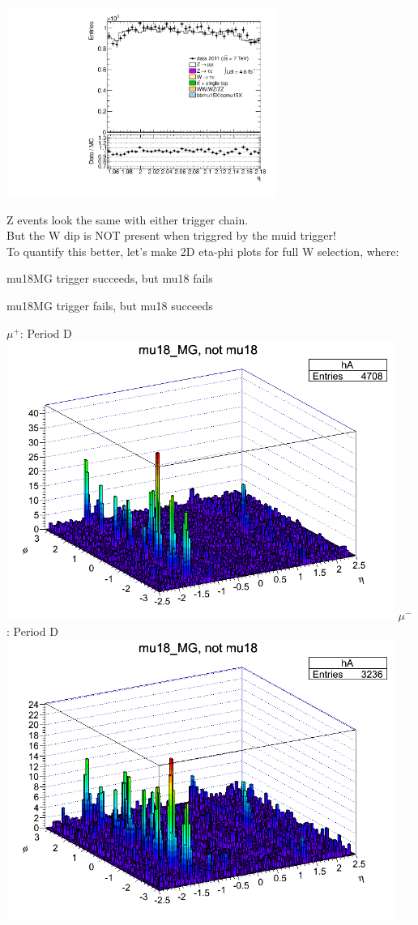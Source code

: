 {\includegraphics[width=0.66\textwidth]{dates/20130306/figures/mu18/ZMU18_10_A_stack_lN_eta_ALL.pdf} 
\cole
}

 {
 Z events look the same with either trigger chain. \\
 But the W dip is NOT present when triggred by the muid trigger! \\
 To quantify this better, let's make 2D eta-phi plots for full W selection, where:
 \iteb
 \item mu18MG trigger succeeds, but mu18 fails
 \item mu18MG trigger fails, but mu18 succeeds
 \itee
}
 {
\colb[T]
$\mu^+$: Period D
\centering
\includegraphics[width=0.95\textwidth]{dates/20130306/figures/mu18/dump_MG_dataD_w_POS.dat__MG_NOT_MUID.png}
$\mu^-$: Period D
\centering
\includegraphics[width=0.95\textwidth]{dates/20130306/figures/mu18/dump_MG_dataD_w_NEG.dat__MG_NOT_MUID.png}
\cole
}
